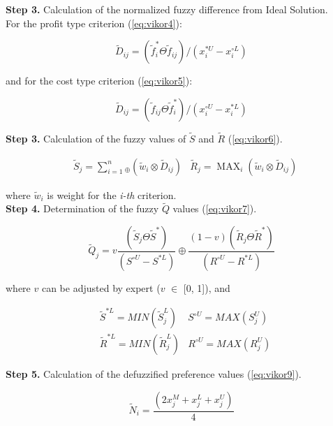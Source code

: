 \noindent \textbf{Step 3.} Calculation of the normalized fuzzy difference from Ideal Solution. \\

\noindent For the profit type criterion (\ref{eq:vikor4}):

\begin{equation}
    \tilde{D}_{i j}=\left(\tilde{f}_{i}^{*} \Theta \tilde{f}_{i j}\right) /\left(x_{i}^{*U}-x_{i}^{\circ L}\right)
    \label{eq:vikor4}
\end{equation}

\noindent and for the cost type criterion (\ref{eq:vikor5}):

\begin{equation}
     \tilde{D}_{i j}=\left(\tilde{f}_{i j} \Theta \tilde{f}_{i}^{*}\right) /\left(x_{i}^{\circ U}-x_{i}^{* L}\right)
     \label{eq:vikor5}
\end{equation}

\noindent \textbf{Step 3.} Calculation of the fuzzy values of $\tilde{S}$ and $\tilde{R}$ (\ref{eq:vikor6}).

\begin{equation}
\begin{aligned}
& \tilde{S}_{j}=\sum_{i=1}^{n}{ }_{\oplus}\left(\tilde{w}_{i} \otimes \tilde{D}_{i j}\right) 
& \tilde{R}_{j}=\operatorname{MAX}_{i}\left(\tilde{w}_{i} \otimes \tilde{D}_{i j}\right)
\end{aligned}
\label{eq:vikor6}
\end{equation}

where $\tilde{w}_{i}$ is weight for the \textit{i-th} criterion.\\

\noindent \textbf{Step 4.} Determination of the fuzzy $\tilde{Q}$ values (\ref{eq:vikor7}).

\begin{equation}
    \tilde{Q}_{j}=v\frac{\left(\tilde{S}_{j} \Theta \tilde{S}^{*}\right)}{\left(S^{\circ U}-S^{* L}\right)} \oplus \frac{(1-v)\left(\tilde{R}_{j} \Theta \tilde{R}^{*}\right)}{\left(R^{\circ U}-R^{* L}\right)}
    \label{eq:vikor7}
\end{equation}

\noindent where $v$ can be adjusted by expert ($v$ $\in$ [0, 1]), and 

\begin{equation}
\begin{aligned}
& \tilde{S}^{*L}=MIN(\tilde{S}_{j}^L) & S^{\circ U}=MAX(S_{j}^{U}) \\
& \tilde{R}^{*L}=MIN(\tilde{R}_{j}^L) & R^{\circ U}=MAX(R_{j}^{U})  
\end{aligned}
\label{eq:vikor8}
\end{equation}

\noindent \textbf{Step 5.} Calculation of the defuzzified preference values (\ref{eq:vikor9}).

\begin{equation}
\tilde{N}_i=\frac{(2 x_{j}^M+x_{j}^L+x_{j}^U)}{4}
\label{eq:vikor9}
\end{equation}